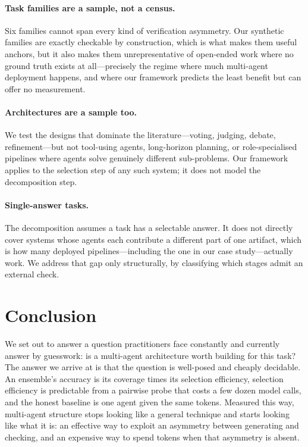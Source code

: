 \paragraph{Task families are a sample, not a census.} Six families cannot span
every kind of verification asymmetry. Our synthetic families are exactly
checkable by construction, which is what makes them useful anchors, but it also
makes them unrepresentative of open-ended work where no ground truth exists at
all---precisely the regime where much multi-agent deployment happens, and where
our framework predicts the least benefit but can offer no measurement.

\paragraph{Architectures are a sample too.} We test the designs that dominate
the literature---voting, judging, debate, refinement---but not tool-using
agents, long-horizon planning, or role-specialised pipelines where agents solve
genuinely different sub-problems. Our framework applies to the selection step of
any such system; it does not model the decomposition step.

\paragraph{Single-answer tasks.} The decomposition assumes a task has a
selectable answer. It does not directly cover systems whose agents each
contribute a different part of one artifact, which is how many deployed
pipelines---including the one in our case study---actually work. We address that
gap only structurally, by classifying which stages admit an external check.

\section{Conclusion}

We set out to answer a question practitioners face constantly and currently
answer by guesswork: is a multi-agent architecture worth building for this task?
The answer we arrive at is that the question is well-posed and cheaply
decidable. An ensemble's accuracy is its coverage times its selection
efficiency, selection efficiency is predictable from a pairwise probe that costs
a few dozen model calls, and the honest baseline is one agent given the same
tokens. Measured this way, multi-agent structure stops looking like a general
technique and starts looking like what it is: an effective way to exploit an
asymmetry between generating and checking, and an expensive way to spend tokens
when that asymmetry is absent.
